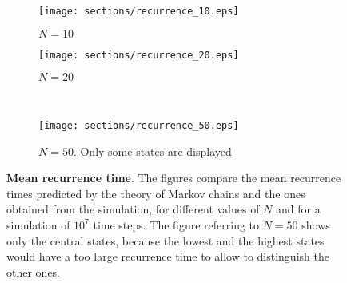 \begin{figure}
  \begin{subfigure}{.5\textwidth}
      \centering
      \texttt{[image: sections/recurrence\_10.eps]}
      \caption{$N = 10$}
    \end{subfigure}
    \begin{subfigure}{.5\textwidth}
      \centering
      \texttt{[image: sections/recurrence\_20.eps]}
      \caption{$N = 20$}
    \end{subfigure}\\
    \begin{center}
    \begin{subfigure}{0.5\textwidth}
      \centering
      \texttt{[image: sections/recurrence\_50.eps]}
      \caption{$N = 50$. Only some states are displayed}
    \end{subfigure}%
  \end{center}

  \captionsetup{width=.9\linewidth}
  \caption{\textbf{Mean recurrence time}. The figures compare the mean recurrence times predicted by the theory of Markov chains and the ones obtained from the simulation, for different values of $N$ and for a simulation of $10^7$ time steps. The figure referring to $N = 50$ shows only the central states, because the lowest and the highest states would have a too large recurrence time to allow to distinguish the other ones.}
  \label{fig:recurrence}
\end{figure}



